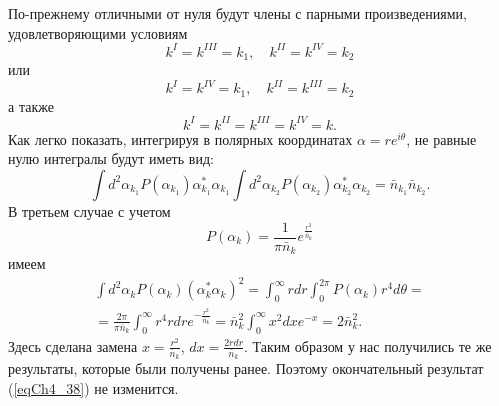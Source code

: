 По-прежнему отличными от нуля будут члены с парными произведениями,
удовлетворяющими условиям
\[
k^{I} = k^{III} = k_1, \quad k^{II} = k^{IV} = k_2
\]
или
\[
k^{I} = k^{IV} = k_1, \quad k^{II} = k^{III} = k_2
\]
а также
\[
k^{I} = k^{II} =  k^{III} = k^{IV} = k.
\]   
Как легко показать, интегрируя в полярных координатах $\alpha = r
e^{i\theta}$, не равные нулю интегралы будут иметь вид:
\begin{equation}
\int d^2 \alpha_{k_1} P\left(\alpha_{k_1}\right)
\alpha_{k_1}^{*} \alpha_{k_1}
\int d^2 \alpha_{k_2} P\left(\alpha_{k_2}\right)
\alpha_{k_2}^{*} \alpha_{k_2} = 
\bar{n}_{k_1} \bar{n}_{k_2}.
\nonumber
\end{equation}
В третьем случае с учетом 
\[
P\left(\alpha_k\right) = \frac{1}{\pi \bar{n}_k}e^{\frac{r^2}{\bar{n}_k}}
\]
имеем
\begin{eqnarray}
\int d^2\alpha_k P\left(\alpha_k\right)
\left(\alpha_k^{*}\alpha_k\right)^2 = 
\int_0^{\infty}r dr \int_0^{2\pi}P\left(\alpha_k\right) r^4 d \theta = 
\nonumber \\
= \frac{2 \pi}{\pi \bar{n}_k}\int_0^{\infty} r^4 r dr e^{-
  \frac{r^2}{\bar{n}_k}} = 
\bar{n}_k^2 \int_0^{\infty}x^2 d x e^{-x} = 2 \bar{n}_k^2.
\nonumber
\end{eqnarray}
Здесь сделана замена $x = \frac{r^2}{\bar{n}_k}$, $dx = \frac{2 r
  dr}{\bar{n}_k}$.
Таким образом у нас получились те же результаты, которые были получены
ранее. Поэтому окончательный результат (\ref{eqCh4_38}) не изменится.
